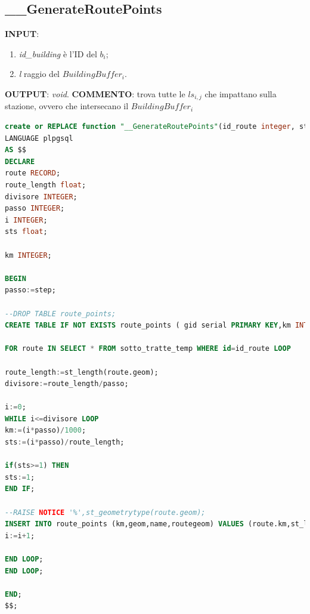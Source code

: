 \subsection{\_\_GenerateRoutePoints}

\textbf{INPUT}: 
\begin{enumerate}
	\item \textit{id\_building} è l'ID del $b_i$;
	\item \textit{l} raggio del $BuildingBuffer_i$.
\end{enumerate}
\textbf{OUTPUT}: \textit{void}. \newline
\textbf{COMMENTO}: trova tutte le $ls_{i,j}$ che impattano sulla stazione, ovvero che intersecano il $BuildingBuffer_i$

\begin{lstlisting}[language=SQL]
create or REPLACE function "__GenerateRoutePoints"(id_route integer, step integer) returns void
LANGUAGE plpgsql
AS $$
DECLARE
route RECORD;
route_length float;
divisore INTEGER;
passo INTEGER;
i INTEGER;
sts float;

km INTEGER;

BEGIN
passo:=step;

--DROP TABLE route_points;
CREATE TABLE IF NOT EXISTS route_points ( gid serial PRIMARY KEY,km INTEGER, geom Geometry, name varchar,routegeom geometry);

FOR route IN SELECT * FROM sotto_tratte_temp WHERE id=id_route LOOP

route_length:=st_length(route.geom);
divisore:=route_length/passo;

i:=0;
WHILE i<=divisore LOOP
km:=(i*passo)/1000;
sts:=(i*passo)/route_length;

if(sts>=1) THEN
sts:=1;
END IF;

--RAISE NOTICE '%',st_geometrytype(route.geom);
INSERT INTO route_points (km,geom,name,routegeom) VALUES (route.km,st_lineinterpolatepoint(route.geom,sts),route.name,route.geom);
i:=i+1;

END LOOP;
END LOOP;

END;
$$;
\end{lstlisting}